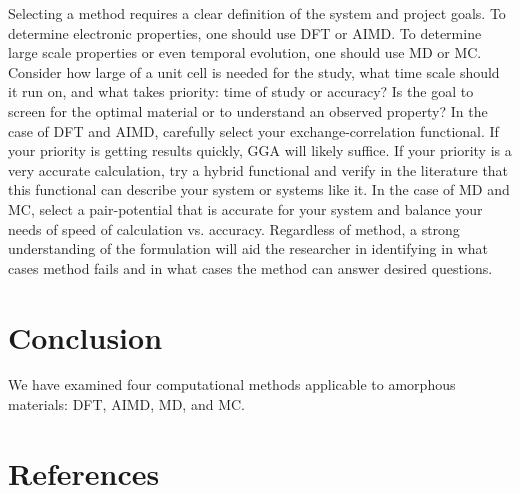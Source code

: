 \documentclass[3p,review,12pt]{elsarticle}
\begin{document}
Selecting a method requires a clear definition of the system and project goals. To determine electronic properties, one should use DFT or AIMD. To determine large scale properties or even temporal evolution, one should use MD or MC. Consider how large of a unit cell is needed for the study, what time scale should it run on, and what takes priority: time of study or accuracy? Is the goal to screen for the optimal material or to understand an observed property? In the case of DFT and AIMD, carefully select your exchange-correlation functional. If your priority is getting results quickly, GGA will likely suffice. If your priority is a very accurate calculation, try a hybrid functional and verify in the literature that this functional can describe your system or systems like it. In the case of MD and MC, select a pair-potential that is accurate for your system and balance your needs of speed of calculation vs. accuracy. Regardless of method, a strong understanding of the formulation will aid the researcher in identifying in what cases method fails and in what cases the method can answer desired questions.




\section{Conclusion}
We have examined four computational methods applicable to amorphous materials: DFT, AIMD, MD, and MC.




\section*{References}



\end{document}
